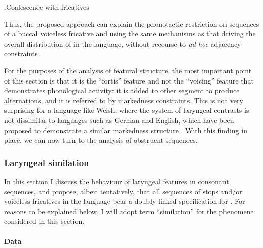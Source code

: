 \ex.\label{ex:iachau-tableau}Coalescence with fricatives\\

Thus, the proposed approach can explain the phonotactic restriction on sequences of a buccal voiceless fricative and \ipa{[h]} using the same mechanisms as that driving the overall distribution of \ipa{[h]} in the language, without recourse to \emph{ad hoc} adjacency constraints.

For the purposes of the analysis of featural structure, the most important point of this section is that it is the \enquote{fortis} feature  and not the \enquote{voicing} feature that demonstrates phonological activity: it is added to other segment to produce alternations, and it is referred to by markedness constraints. This is not very surprising for a language like Welsh, where the system of laryngeal contrasts is not dissimilar to languages such as German and English, which have been proposed to demonstrate a similar markedness structure \citep[\egm][]{iverson95,iverson99:_laryn_german,iverson03:_laryn_german,honeybone01:_lenit_liver_englis,jessen02:_laryn_german,petrova06:_voice,honeybone05,honeyboneng:_lenit_englis}. With this finding in place, we can now turn to the analysis of obstruent sequences.


\subsubsection{Laryngeal similation}
\label{sec:laryng-assim}

In this section I discuss the behaviour of laryngeal features in consonant sequences, and propose, albeit tentatively, that all sequences of stops and\fshyp or voiceless fricatives in the language bear a doubly linked specification for . For reasons to be explained below, I will adopt  term \enquote{similation} for the phenomena considered in this section.

\paragraph{Data}
\label{sec:data-5}

